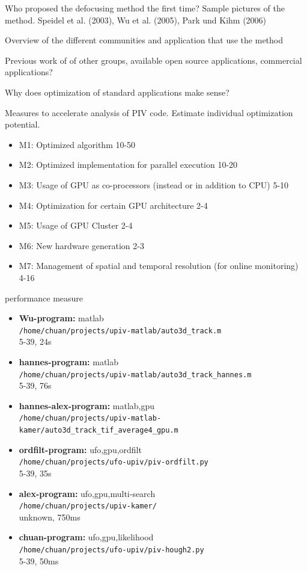 
Who proposed the defocusing method the first time? Sample pictures of the method. 
Speidel et al. (2003), Wu et al. (2005), Park und Kihm (2006)


Overview of the different communities and application that use the method


Previous work of of other groups, available open source applications, commercial applications?

Why does optimization of standard applications make sense?


Measures to accelerate analysis of PIV code. Estimate individual optimization potential. 
\begin{itemize}
\item M1: Optimized algorithm 10-50
\item M2: Optimized implementation for parallel execution 10-20
\item M3: Usage of GPU as co-processors (instead or in addition to CPU) 5-10
\item M4: Optimization for certain GPU architecture 2-4
\item M5: Usage of GPU Cluster 2-4
\item M6: New hardware generation 2-3
\item M7: Management of spatial and temporal resolution (for online monitoring) 4-16
\end{itemize}

performance measure
\begin{itemize}
\item \textbf{Wu-program:} matlab\\
    \texttt{/home/chuan/projects/upiv-matlab/auto3d\_track.m}\\
    5-39, 24s
\item \textbf{hannes-program:} matlab\\ 
    \texttt{/home/chuan/projects/upiv-matlab/auto3d\_track\_hannes.m}\\
    5-39, 76s
\item \textbf{hannes-alex-program:}  matlab,gpu\\
    \texttt{/home/chuan/projects/upiv-matlab-kamer/auto3d\_track\_tif\_average4\_gpu.m}
\item \textbf{ordfilt-program:} ufo,gpu,ordfilt\\
    \texttt{/home/chuan/projects/ufo-upiv/piv-ordfilt.py}\\
    5-39, 35s
\item \textbf{alex-program:} ufo,gpu,multi-search\\
    \texttt{/home/chuan/projects/upiv-kamer/} \\
    unknown, 750ms
\item \textbf{chuan-program:} ufo,gpu,likelihood\\
    \texttt{/home/chuan/projects/ufo-upiv/piv-hough2.py}\\
    5-39, 50ms
\end{itemize}

